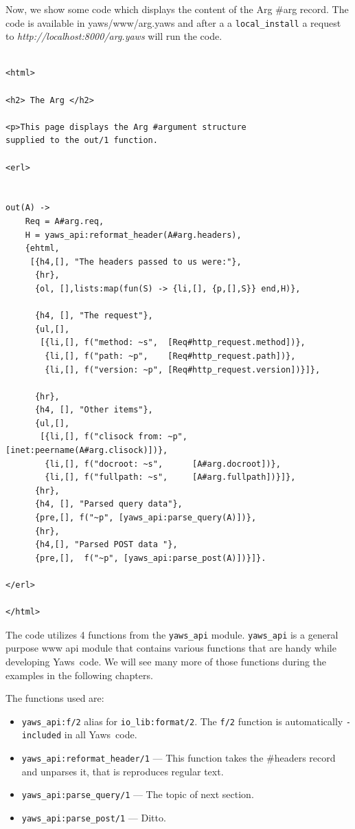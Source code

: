 \documentclass[11pt,oneside,english]{book}
\newcommand{\Yaws}            %
        {{\sc Yaws}}
\begin{document}
Now, we show some code which displays the content of the Arg \#arg record.
The code is available in yaws/www/arg.yaws and after a a \verb+local_install+
a request to \textit{http://localhost:8000/arg.yaws} will run the code.

\begin{verbatim}

<html>

<h2> The Arg </h2>

<p>This page displays the Arg #argument structure
supplied to the out/1 function.

<erl>


out(A) ->
    Req = A#arg.req,
    H = yaws_api:reformat_header(A#arg.headers),
    {ehtml,
     [{h4,[], "The headers passed to us were:"},
      {hr},
      {ol, [],lists:map(fun(S) -> {li,[], {p,[],S}} end,H)},

      {h4, [], "The request"},
      {ul,[],
       [{li,[], f("method: ~s",  [Req#http_request.method])},
        {li,[], f("path: ~p",    [Req#http_request.path])},
        {li,[], f("version: ~p", [Req#http_request.version])}]},

      {hr},
      {h4, [], "Other items"},
      {ul,[],
       [{li,[], f("clisock from: ~p", [inet:peername(A#arg.clisock)])},
        {li,[], f("docroot: ~s",      [A#arg.docroot])},
        {li,[], f("fullpath: ~s",     [A#arg.fullpath])}]},
      {hr},
      {h4, [], "Parsed query data"},
      {pre,[], f("~p", [yaws_api:parse_query(A)])},
      {hr},
      {h4,[], "Parsed POST data "},
      {pre,[],  f("~p", [yaws_api:parse_post(A)])}]}.

</erl>

</html>

\end{verbatim}


The code utilizes 4 functions from the \verb+yaws_api+ module.
\verb+yaws_api+ is a general purpose www api module that contains various
functions that are handy while developing \Yaws\  code. We will see many
more of those functions during the examples in the following chapters.

The functions used are:
\begin{itemize}
\item \verb+yaws_api:f/2+ alias for \verb+io_lib:format/2+. The
  \verb+f/2+ function is automatically \verb+-included+ in all
  \Yaws\  code.
\item \verb+yaws_api:reformat_header/1+ --- This function takes the \#headers record
and unparses it, that is reproduces regular text.
\item \verb+yaws_api:parse_query/1+ --- The topic of next section.
\item \verb+yaws_api:parse_post/1+ --- Ditto.
\end{itemize}
\end{document}
